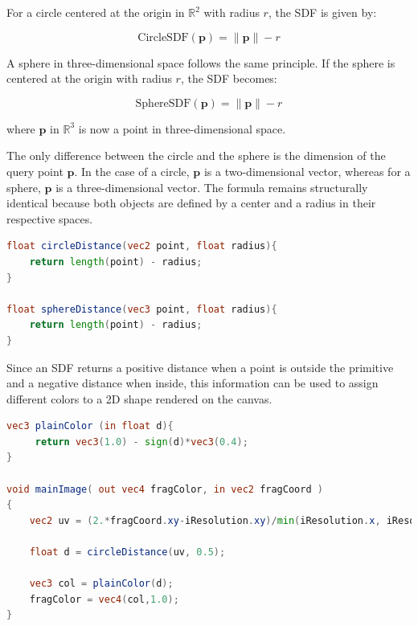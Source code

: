 For a circle centered at the origin in $ \mathbb{R}^ 2 $ with radius $r$, the SDF is given by:

$$\text{CircleSDF}(\mathbf{p}) = \|\mathbf{p}\| - r$$

A sphere in three-dimensional space follows the same principle. If the sphere is centered at the origin with radius $r$, the SDF becomes:

$$\text{SphereSDF}(\mathbf{p}) = \|\mathbf{p}\| - r$$


where $\mathbf{p}$ in $\mathbb{R}^3 $ is now a point in three-dimensional space.

The only difference between the circle and the sphere is the dimension of the query point $\mathbf{p}$. In the case of a circle, $\mathbf{p}$ is a two-dimensional vector, whereas for a sphere, $\mathbf{p}$ is a three-dimensional vector. The formula remains structurally identical because both objects are defined by a center and a radius in their respective spaces.

\begin{lstlisting}[language=GLSL, caption={Code 2: Circle and Sphere SDFs}, label={lst:CircleAndSphere} float=H]
float circleDistance(vec2 point, float radius){
    return length(point) - radius;
}

float sphereDistance(vec3 point, float radius){
    return length(point) - radius;
}
\end{lstlisting}

Since an SDF returns a positive distance when a point is outside the primitive and a negative distance when inside, this information can be used to assign different colors to a 2D shape rendered on the canvas.

\begin{lstlisting}[language=GLSL, caption={Code 3: Rendering Circles}, label={lst:ColoringCircle} float=H]
vec3 plainColor (in float d){
     return vec3(1.0) - sign(d)*vec3(0.4);
}

void mainImage( out vec4 fragColor, in vec2 fragCoord )
{
    vec2 uv = (2.*fragCoord.xy-iResolution.xy)/min(iResolution.x, iResolution.y);

    float d = circleDistance(uv, 0.5);

    vec3 col = plainColor(d);
    fragColor = vec4(col,1.0);
}
\end{lstlisting}

